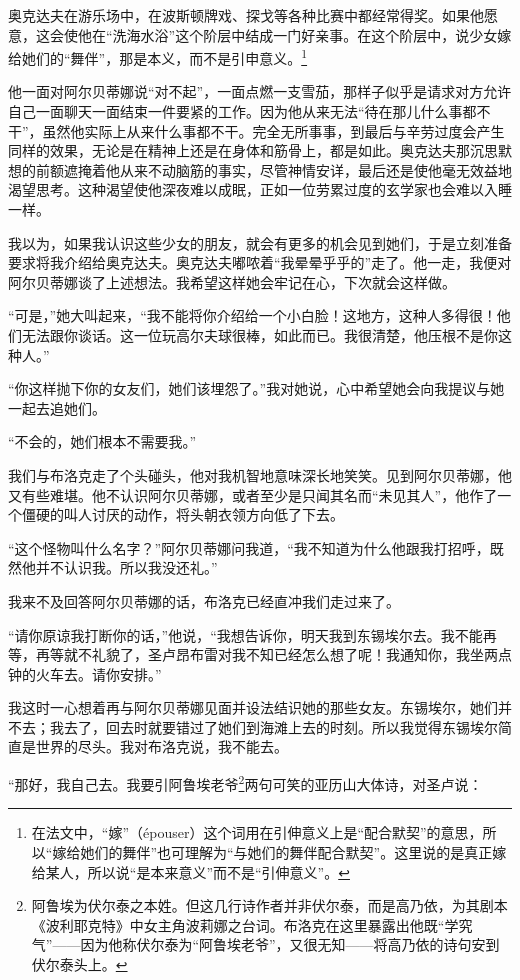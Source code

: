 \par 奥克达夫在游乐场中，在波斯顿牌戏、探戈等各种比赛中都经常得奖。如果他愿意，这会使他在“洗海水浴”这个阶层中结成一门好亲事。在这个阶层中，说少女嫁给她们的“舞伴”，那是本义，而不是引申意义。\footnote{在法文中，“嫁”（épouser）这个词用在引伸意义上是“配合默契”的意思，所以“嫁给她们的舞伴”也可理解为“与她们的舞伴配合默契”。这里说的是真正嫁给某人，所以说“是本来意义”而不是“引伸意义”。}
\par 他一面对阿尔贝蒂娜说“对不起”，一面点燃一支雪茄，那样子似乎是请求对方允许自己一面聊天一面结束一件要紧的工作。因为他从来无法“待在那儿什么事都不干”，虽然他实际上从来什么事都不干。完全无所事事，到最后与辛劳过度会产生同样的效果，无论是在精神上还是在身体和筋骨上，都是如此。奥克达夫那沉思默想的前额遮掩着他从来不动脑筋的事实，尽管神情安详，最后还是使他毫无效益地渴望思考。这种渴望使他深夜难以成眠，正如一位劳累过度的玄学家也会难以入睡一样。
\par 我以为，如果我认识这些少女的朋友，就会有更多的机会见到她们，于是立刻准备要求将我介绍给奥克达夫。奥克达夫嘟哝着“我晕晕乎乎的”走了。他一走，我便对阿尔贝蒂娜谈了上述想法。我希望这样她会牢记在心，下次就会这样做。
\par “可是，”她大叫起来，“我不能将你介绍给一个小白脸！这地方，这种人多得很！他们无法跟你谈话。这一位玩高尔夫球很棒，如此而已。我很清楚，他压根不是你这种人。”
\par “你这样抛下你的女友们，她们该埋怨了。”我对她说，心中希望她会向我提议与她一起去追她们。
\par “不会的，她们根本不需要我。”
\par 我们与布洛克走了个头碰头，他对我机智地意味深长地笑笑。见到阿尔贝蒂娜，他又有些难堪。他不认识阿尔贝蒂娜，或者至少是只闻其名而“未见其人”，他作了一个僵硬的叫人讨厌的动作，将头朝衣领方向低了下去。
\par “这个怪物叫什么名字？”阿尔贝蒂娜问我道，“我不知道为什么他跟我打招呼，既然他并不认识我。所以我没还礼。”
\par 我来不及回答阿尔贝蒂娜的话，布洛克已经直冲我们走过来了。
\par “请你原谅我打断你的话，”他说，“我想告诉你，明天我到东锡埃尔去。我不能再等，再等就不礼貌了，圣卢昂布雷对我不知已经怎么想了呢！我通知你，我坐两点钟的火车去。请你安排。”
\par 我这时一心想着再与阿尔贝蒂娜见面并设法结识她的那些女友。东锡埃尔，她们并不去；我去了，回去时就要错过了她们到海滩上去的时刻。所以我觉得东锡埃尔简直是世界的尽头。我对布洛克说，我不能去。
\par “那好，我自己去。我要引阿鲁埃老爷\footnote{阿鲁埃为伏尔泰之本姓。但这几行诗作者并非伏尔泰，而是高乃依，为其剧本《波利耶克特》中女主角波莉娜之台词。布洛克在这里暴露出他既“学究气”——因为他称伏尔泰为“阿鲁埃老爷”，又很无知——将高乃依的诗句安到伏尔泰头上。}两句可笑的亚历山大体诗，对圣卢说：
